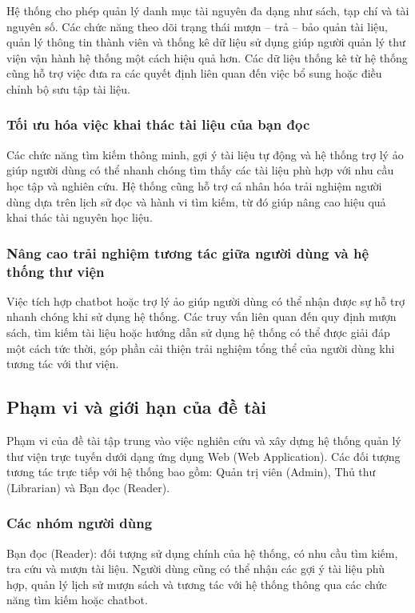 Hệ thống cho phép quản lý danh mục tài nguyên đa dạng như sách, tạp chí và tài nguyên số. Các chức năng theo dõi trạng thái mượn – trả – bảo quản tài liệu, quản lý thông tin thành viên và thống kê dữ liệu sử dụng giúp người quản lý thư viện vận hành hệ thống một cách hiệu quả hơn. Các dữ liệu thống kê từ hệ thống cũng hỗ trợ việc đưa ra các quyết định liên quan đến việc bổ sung hoặc điều chỉnh bộ sưu tập tài liệu.

\subsubsection{Tối ưu hóa việc khai thác tài liệu của bạn đọc}

Các chức năng tìm kiếm thông minh, gợi ý tài liệu tự động và hệ thống trợ lý ảo giúp người dùng có thể nhanh chóng tìm thấy các tài liệu phù hợp với nhu cầu học tập và nghiên cứu. Hệ thống cũng hỗ trợ cá nhân hóa trải nghiệm người dùng dựa trên lịch sử đọc và hành vi tìm kiếm, từ đó giúp nâng cao hiệu quả khai thác tài nguyên học liệu.

\subsubsection{Nâng cao trải nghiệm tương tác giữa người dùng và hệ thống thư viện}

Việc tích hợp chatbot hoặc trợ lý ảo giúp người dùng có thể nhận được sự hỗ trợ nhanh chóng khi sử dụng hệ thống. Các truy vấn liên quan đến quy định mượn sách, tìm kiếm tài liệu hoặc hướng dẫn sử dụng hệ thống có thể được giải đáp một cách tức thời, góp phần cải thiện trải nghiệm tổng thể của người dùng khi tương tác với thư viện.

\subsection{Phạm vi và giới hạn của đề tài}

Phạm vi của đề tài tập trung vào việc nghiên cứu và xây dựng hệ thống quản lý thư viện trực tuyến dưới dạng ứng dụng Web (Web Application). Các đối tượng tương tác trực tiếp với hệ thống bao gồm: Quản trị viên (Admin), Thủ thư (Librarian) và Bạn đọc (Reader).

\subsubsection{Các nhóm người dùng}

Bạn đọc (Reader): đối tượng sử dụng chính của hệ thống, có nhu cầu tìm kiếm, tra cứu và mượn tài liệu. Người dùng cũng có thể nhận các gợi ý tài liệu phù hợp, quản lý lịch sử mượn sách và tương tác với hệ thống thông qua các chức năng tìm kiếm hoặc chatbot.

